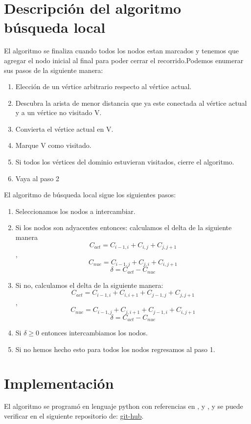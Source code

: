\documentclass[12pt,a4paper]{article}
\begin{document}
\section{Descripción del algoritmo búsqueda local}
 El algoritmo se finaliza cuando todos los nodos estan marcados y tenemos que agregar el nodo inicial al final para poder cerrar el recorrido.Podemos enumerar sus pasos de la siguiente manera:
\begin{enumerate}
    \item Elección de un vértice arbitrario respecto al vértice actual.
    \item Descubra la arista de menor distancia que ya este conectada al vértice actual y a un vértice no visitado V.
    \item Convierta el vértice actual en V.
    \item Marque V como visitado.
    \item Si todos los vértices del dominio estuvieran visitados, cierre el algoritmo.
    \item Vaya al paso 2
\end{enumerate}
El algoritmo de búsqueda local sigue los siguientes pasos:
\begin{enumerate}
    \item Seleccionamos los nodos a intercambiar.
    \item Si los nodos son adyacentes entonces: calculamos el delta de la siguiente manera $$C_{act} = C_{i-1,i}+C_{i,j}+C_{j,j+1}$$, $$C_{nue} = C_{i-1,j}+C_{j,i}+C_{i,j+1}$$ $$\delta = C_{act} - C_{nue}$$
    \item Si no, calculamos el delta de la siguiente manera: $$C_{act} = C_{i-1,i}+C_{i,i+1}+C_{j-1,j}+C_{j,j+1}$$, $$C_{nue} = C_{i-1,j}+C_{j,i+1}+C_{j-1,i}+C_{i,j+1}$$ $$\delta = C_{act} - C_{nue}$$
    \item Si $\delta \geq 0$ entonces intercambiamos los nodos.
    \item Si no hemos hecho esto para todos los nodos regresamos al paso 1. 
\end{enumerate}
\section{Implementación} 
El algoritmo se programó en lenguaje python con referencias en \cite{van1991guia}, \cite{van2017tutorial} y \cite{chun2001core}, y se puede verificar en el siguiente repositorio de: \href{https://github.com/arnoldae9/PycharmProjects.git}{git-hub}.
\end{document}
